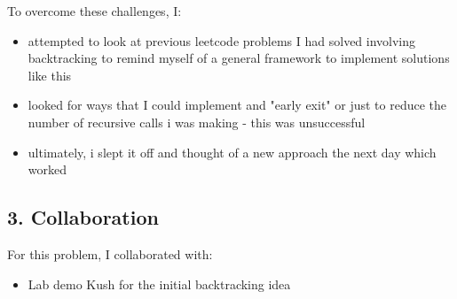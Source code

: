 \documentclass[a4paper,12pt]{article}
\begin{document}
To overcome these challenges, I:
\begin{itemize}
    \item attempted to look at previous leetcode problems I had solved involving backtracking to remind myself of a general framework to implement solutions like this
    \item looked for ways that I could implement and "early exit" or just to reduce the number of recursive calls i was making - this was unsuccessful
    \item ultimately, i slept it off and thought of a new approach the next day which worked
\end{itemize}

\subsection*{3. Collaboration}
For this problem, I collaborated with:
\begin{itemize}
    \item Lab demo Kush for the initial backtracking idea
\end{itemize}
\end{document}
